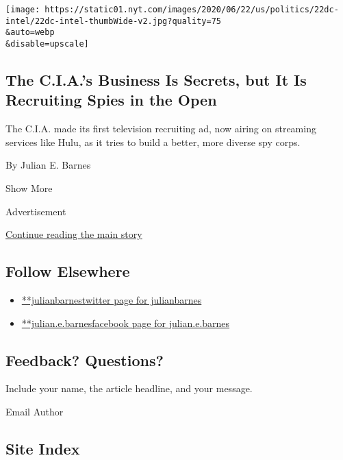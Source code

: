 \begin{enumerate}
  \texttt{[image: https://static01.nyt.com/images/2020/06/22/us/politics/22dc-intel/22dc-intel-thumbWide-v2.jpg?quality=75\\\&auto=webp\\\&disable=upscale]}

  \hypertarget{the-cias-business-is-secrets-but-it-is-recruiting-spies-in-the-open}{%
  \subsection{The C.I.A.'s Business Is Secrets, but It Is Recruiting
  Spies in the
  Open}\label{the-cias-business-is-secrets-but-it-is-recruiting-spies-in-the-open}}

  The C.I.A. made its first television recruiting ad, now airing on
  streaming services like Hulu, as it tries to build a better, more
  diverse spy corps.

  By Julian E. Barnes
\end{enumerate}

Show More

Advertisement

\protect\hyperlink{after-mid2}{Continue reading the main story}

\hypertarget{follow-elsewhere}{%
\subsection{Follow Elsewhere}\label{follow-elsewhere}}

\begin{itemize}
\tightlist
\item
  \href{https://twitter.com/julianbarnes}{**julianbarnestwitter page for
  julianbarnes}
\item
  \href{https://www.facebook.com/julian.e.barnes}{**julian.e.barnesfacebook
  page for julian.e.barnes}
\end{itemize}

\hypertarget{feedback-questions}{%
\subsection{Feedback? Questions?}\label{feedback-questions}}

Include your name, the article headline, and your message.

Email Author

\hypertarget{site-index}{%
\subsection{Site Index}\label{site-index}}

